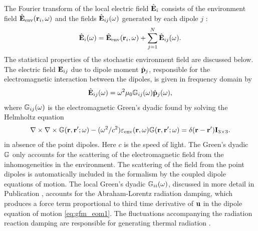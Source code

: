 The Fourier transform of the local electric field $\hat {\mathbf{E}}_i$ consists of the environment field $\hat{\mathbf{E}}_{\textrm{env}}(\mathbf{r}_i,\omega)$ and the fields $\hat {\mathbf{E}}_{ij}(\omega)$ generated by each dipole $j$ \cite{novotny}:
\begin{equation}
 \hat{\mathbf{E}}_i(\omega)= \hat{\mathbf{E}}_{\textrm{env}}(\mathbf{r}_i,\omega) + \sum_{j=1}^N \hat{\mathbf{E}}_{ij}(\omega). \label{eq:gfm_etot}
\end{equation}
The statistical properties of the stochastic environment field are discussed below. The electric field $\mathbf{E}_{ij}$ due to dipole moment $\hat{\mathbf{p}}_j$, responsible for the electromagnetic interaction between the dipoles, is given in frequency domain by \cite{novotny}
\begin{equation}
 \hat{\mathbf{E}}_{ij}(\omega) = \omega^2 \mu_0\mathbb{G}_{ij}(\omega) \hat{\mathbf{p}}_j (\omega), \label{eq:gfm_ekl}
\end{equation}
where $\mathbb{G}_{ij}(\omega)$ is the electromagnetic Green's dyadic found by solving the Helmholtz equation \cite{novotny}
 \begin{equation}
 \nabla \times \nabla \times \mathbb{G}(\mathbf{r},\mathbf{r}';\omega) - (\omega^2/c^2) \varepsilon_{\textrm{env}}(\mathbf{r},\omega)\mathbb{G}(\mathbf{r},\mathbf{r}';\omega)  =  \delta(\mathbf{r}-\mathbf{r}')\mathbf{I}_{3 \times 3}. \label{eq:gemdef}
\end{equation}
in absence of the point dipoles. Here $c$ is the speed of light. The Green's dyadic $\mathbb{G}$ only accounts for the scattering of the electromagnetic field from the inhomogeneities in the environment. The scattering of the field from the point dipoles is automatically included in the formalism by the coupled dipole equations of motion. The local Green's dyadic $\mathbb{G}_{ii}(\omega)$, discussed in more detail in Publication , accounts for the Abraham-Lorentz radiation damping, which produces a force term proportional to third time derivative of $\mathbf{u}$ in the dipole equation of motion \eqref{eq:gfm_eom1}. The fluctuations accompanying the radiation reaction damping are responsible for generating thermal radiation \cite{greffet10}.

